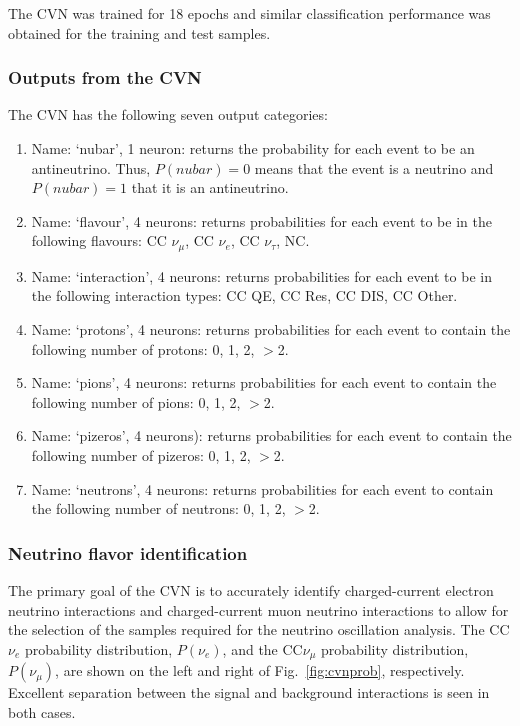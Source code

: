 The CVN was trained for 18 epochs and similar classification performance was obtained for the training and test samples.

\subsubsection{Outputs from the CVN}
\label{sec:cvn:outputs}
The CVN has the following seven output categories:

\begin{enumerate}
    \item Name: `nubar', 1 neuron: returns the probability for each event to be an antineutrino. Thus, $P(nubar)=0$ means that the event is a neutrino and $P(nubar)=1$ that it is an antineutrino.
    \item Name: `flavour', 4 neurons: returns probabilities for each event to be in the following flavours: CC $\nu_\mu$, CC $\nu_e$, CC $\nu_\tau$, NC.
    \item Name: `interaction', 4 neurons: returns probabilities for each event to be in the following interaction types: CC QE, CC Res, CC DIS, CC Other. 
    \item Name: `protons', 4 neurons: returns probabilities for each event to contain the following number of protons: 0, 1, 2, $>$2.
    \item Name: `pions', 4 neurons: returns probabilities for each event to contain the following number of pions: 0, 1, 2, $>$2.
    \item Name: `pizeros', 4 neurons): returns probabilities for each event to contain the following number of pizeros: 0, 1, 2, $>$2.
    \item Name: `neutrons', 4 neurons: returns probabilities for each event to contain the following number of neutrons: 0, 1, 2, $>$2.
\end{enumerate}

\subsubsection{Neutrino flavor identification}
The primary goal of the CVN is to accurately identify charged-current electron neutrino interactions and charged-current muon neutrino interactions to allow for the selection of the samples required for the neutrino oscillation analysis. The CC$\nu_e$ probability distribution, $P(\nu_e)$, and the CC$\nu_\mu$ probability distribution, $P(\nu_\mu)$, are shown on the left and right of Fig.~\ref{fig:cvnprob}, respectively. Excellent separation between the signal and background interactions is seen in both cases.

